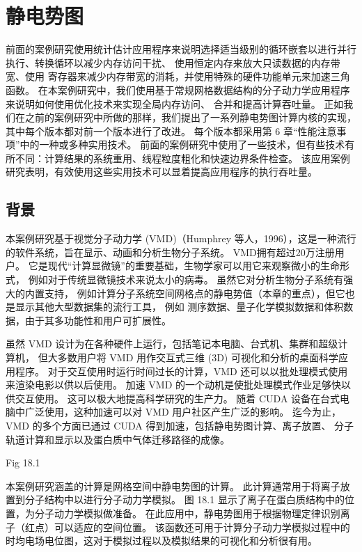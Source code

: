 \section{静电势图}
前面的案例研究使用统计估计应用程序来说明选择适当级别的循环嵌套以进行并行执行、转换循环以减少内存访问干扰、
使用恒定内存来放大只读数据的内存带宽、使用 寄存器来减少内存带宽的消耗，并使用特殊的硬件功能单元来加速三角函数。 
在本案例研究中，我们使用基于常规网格数据结构的分子动力学应用程序来说明如何使用优化技术来实现全局内存访问、
合并和提高计算吞吐量。 正如我们在之前的案例研究中所做的那样，我们提出了一系列静电势图计算内核的实现，
其中每个版本都对前一个版本进行了改进。 每个版本都采用第 6 章“性能注意事项”中的一种或多种实用技术。 
前面的案例研究中使用了一些技术，但有些技术有所不同：计算结果的系统重用、线程粒度粗化和快速边界条件检查。 
该应用案例研究表明，有效使用这些实用技术可以显着提高应用程序的执行吞吐量。

\subsection{背景}
本案例研究基于视觉分子动力学 (VMD)（Humphrey 等人，1996），这是一种流行的软件系统，旨在显示、动画和分析生物分子系统。 
VMD拥有超过20万注册用户。 它是现代“计算显微镜”的重要基础，生物学家可以用它来观察微小的生命形式，
例如对于传统显微镜技术来说太小的病毒。 虽然它对分析生物分子系统有强大的内置支持，
例如计算分子系统空间网格点的静电势值（本章的重点），但它也是显示其他大型数据集的流行工具，
例如 测序数据、量子化学模拟数据和体积数据，由于其多功能性和用户可扩展性。

虽然 VMD 设计为在各种硬件上运行，包括笔记本电脑、台式机、集群和超级计算机，
但大多数用户将 VMD 用作交互式三维 (3D) 可视化和分析的桌面科学应用程序。 
对于交互使用时运行时间过长的计算，VMD 还可以以批处理模式使用来渲染电影以供以后使用。 
加速 VMD 的一个动机是使批处理模式作业足够快以供交互使用。 这可以极大地提高科学研究的生产力。 
随着 CUDA 设备在台式电脑中广泛使用，这种加速可以对 VMD 用户社区产生广泛的影响。 
迄今为止，VMD 的多个方面已通过 CUDA 得到加速，包括静电势图计算、离子放置、
分子轨道计算和显示以及蛋白质中气体迁移路径的成像。

{\color{red} Fig 18.1}

本案例研究涵盖的计算是网格空间中静电势图的计算。 此计算通常用于将离子放置到分子结构中以进行分子动力学模拟。 
图 18.1 显示了离子在蛋白质结构中的位置，为分子动力学模拟做准备。 
在此应用中，静电势图用于根据物理定律识别离子（红点）可以适应的空间位置。 
该函数还可用于计算分子动力学模拟过程中的时均电场电位图，这对于模拟过程以及模拟结果的可视化和分析很有用。

